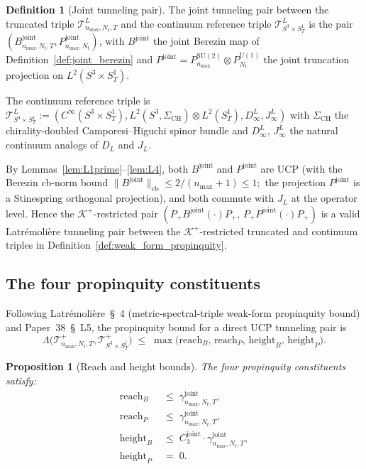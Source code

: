 \documentclass[11pt,a4paper]{article}
\theoremstyle{plain}
\newtheorem{proposition}[theorem]{Proposition}
\theoremstyle{definition}
\newtheorem{definition}[theorem]{Definition}
\newcommand{\nmax}{n_{\max}}
\newcommand{\Nt}{N_{t}}
\newcommand{\sthree}{S^{3}}
\newcommand{\SoneT}{S^{1}_{T}}
\newcommand{\Manifold}{S^{3}\times S^{1}_{T}}
\newcommand{\Krein}{\mathcal{K}}
\newcommand{\Tcal}{\mathcal{T}}
\newcommand{\cbnorm}[1]{\lVert #1 \rVert_{\mathrm{cb}}}
\newcommand{\SU}{\mathrm{SU}}
\newcommand{\Uone}{U(1)}
\newcommand{\DL}{D_{L}}
\newcommand{\JL}{J_{L}}
\newcommand{\Lambdab}{\Lambda}
\newcommand{\Bjoint}{B^{\mathrm{joint}}}
\newcommand{\Pjoint}{P^{\mathrm{joint}}}
\newcommand{\gammajoint}{\gamma^{\mathrm{joint}}}
\newcommand{\Cthreejoint}{C_{3}^{\mathrm{joint}}}
\newcommand{\Kplus}{\Krein^{+}}
\newcommand{\Pplus}{P_{+}}
\begin{document}
\begin{definition}[Joint tunneling pair]\label{def:tunneling_pair}
The joint tunneling pair between the truncated triple
$\Tcal^{L}_{\nmax,\Nt,T}$ and the continuum reference triple
$\Tcal^{L}_{\Manifold}$ is the pair $(\Bjoint_{\nmax,\Nt,T},
\Pjoint_{\nmax,\Nt})$, with $\Bjoint$ the joint Berezin map of
Definition~\ref{def:joint_berezin} and $\Pjoint = P^{\SU(2)}_{\nmax}
\otimes P^{\Uone}_{\Nt}$ the joint truncation projection on
$L^{2}(\Manifold)$.

The continuum reference triple is $\Tcal^{L}_{\Manifold}
:= (C^{\infty}(\Manifold), L^{2}(\sthree, \Sigma_{\mathrm{CH}}) \otimes
L^{2}(\SoneT), D^{L}_{\infty}, J^{L}_{\infty})$ with $\Sigma_{\mathrm{CH}}$
the chirality-doubled Camporesi--Higuchi spinor bundle and
$D^{L}_{\infty}$, $J^{L}_{\infty}$ the natural continuum analogs of
$\DL$ and $\JL$.
\end{definition}

By Lemmas~\ref{lem:L1prime}--\ref{lem:L4}, both $\Bjoint$ and $\Pjoint$
are UCP (with the Berezin cb-norm bound $\cbnorm{\Bjoint} \le 2/(\nmax
+ 1) \le 1$;\ the projection $\Pjoint$ is a Stinespring orthogonal
projection), and both commute with $\JL$ at the operator level. Hence
the $\Kplus$-restricted pair $(\Pplus \Bjoint(\cdot) \Pplus,\, \Pplus
\Pjoint(\cdot) \Pplus)$ is a valid Latr\'emoli\`ere tunneling pair
between the $\Kplus$-restricted truncated and continuum triples in
Definition~\ref{def:weak_form_propinquity}.

\subsection{The four propinquity constituents}\label{sec:constituents}

Following Latr\'emoli\`ere~\cite{latremoliere_metric_st_2017}\S~4
(metric-spectral-triple weak-form propinquity bound) and Paper~38~\S~L5,
the propinquity bound for a direct UCP tunneling pair is
\begin{equation}\label{eq:propinquity_bound}
   \Lambdab\bigl(\Tcal^{+}_{\nmax,\Nt,T}, \Tcal^{+}_{\Manifold}\bigr)
   \;\le\; \max\bigl(\mathrm{reach}_{B},\,
                       \mathrm{reach}_{P},\,
                       \mathrm{height}_{B},\,
                       \mathrm{height}_{P}\bigr).
\end{equation}

\begin{proposition}[Reach and height bounds]\label{prop:reach_height}
The four propinquity constituents satisfy:
\begin{align}
   \mathrm{reach}_{B} &\;\le\; \gammajoint_{\nmax, \Nt, T},
   \label{eq:reach_B} \\
   \mathrm{reach}_{P} &\;\le\; \gammajoint_{\nmax, \Nt, T},
   \label{eq:reach_P} \\
   \mathrm{height}_{B} &\;\le\; \Cthreejoint \cdot \gammajoint_{\nmax, \Nt, T},
   \label{eq:height_B} \\
   \mathrm{height}_{P} &\;=\; 0.
   \label{eq:height_P}
\end{align}
\end{proposition}
\end{document}
